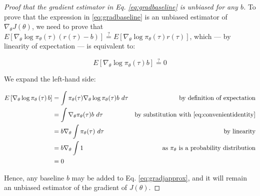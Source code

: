 \documentclass{article}
\begin{document}
\begin{proof}[Proof that the gradient estimator in Eq. \eqref{eq:gradbaseline} is unbiased for any $b$]
  
To prove that the expression in \eqref{eq:gradbaseline} is an unbiased estimator of $ \nabla_\theta J(\theta)$, we need to prove that $E\left[\nabla_\theta\log\pi_\theta\left(\tau\right)\left(r\left(\tau\right)-b\right)\right]\overset{?}{=}E\left[\nabla_\theta\log\pi_\theta\left(\tau\right)r\left(\tau\right)\right]$, which — by linearity of expectation — is equivalent to:

\begin{equation}
  E\left[\nabla_\theta\log\pi_\theta\left(\tau\right)b\right] \overset{?}{=} 0
\end{equation}

We expand the left-hand side:

\begin{subequations}
  \begin{align}
    E\left[\nabla_\theta\log\pi_\theta\left(\tau\right)b\right]
      &= \int \pi_{\theta}(\tau) \nabla_{\theta} \log \pi_{\theta}(\tau) b\ d\tau &\text{by definition of expectation} \\
      &= \int \nabla_{\theta}\pi_{\theta}(\tau) b\ d\tau &\text{by substitution with \eqref{eq:convenientidentity}}\\ 
      &= b\nabla_{\theta}\int \pi_{\theta}(\tau)\ d\tau &\text{by linearity} \\
      &= b\nabla_{\theta}\int 1 &\text{as }\pi_\theta\text{ is a probability distribution} \\
      &= 0 & \\
      \label{eq:}
  \end{align}
\end{subequations}

Hence, any baseline $b$ may be added to Eq. \eqref{eq:gradjapprox}, and it will remain an unbiased estimator of the gradient of $J(\theta)$.
\end{proof}

\small


\end{document}
